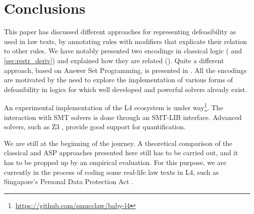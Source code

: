 \section{Conclusions}\label{sec:conclusions}

This paper has discussed different approaches for representing defeasibility
as used in law texts, by annotating rules with modifiers that explicate their
relation to other rules. We have notably presented two encodings in classical
logic ( and \ref{sec:restr_deriv}) and explained
how they are related (). Quite a different approach,
based on Answer Set Programming, is presented in
.  All the encodings are motivated by the need to explore the implementation of various forms of defeasibility in logics for which well developed and powerful solvers already exist.  

An experimental implementation of the L4 ecosystem is under
way\footnote{\url{https://github.com/smucclaw/baby-l4}}. The interaction with
SMT solvers is done through an SMT-LIB \citep{BarFT_SMTLIB} interface. Advanced
solvers, such as Z3 \citep{demoura_bjorner_z3_2008}, provide good support for
quantification. 



We are still at the beginning of the journey. A theoretical comparison of the
classical and ASP approaches presented here still has to be carried out, and
it has to be propped up by an empirical evaluation. For this purpose, we are
currently in the process of coding some real-life law texts in L4, such as
Singapore's Personal Data Protection Act \citep{ppda}.



